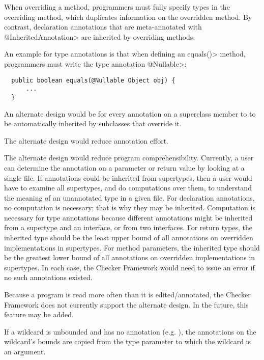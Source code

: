 
When overriding a method, programmers must fully specify types in the overriding
method, which duplicates information on the overridden method.
By contrast, declaration annotations that are meta-annotated with
\<@InheritedAnnotation> are inherited by overriding methods.

An example for type annotations is that when defining an \<equals()>
method, programmers must write the type annotation \<@Nullable>:

\begin{Verbatim}
  public boolean equals(@Nullable Object obj) {
      ...
  }
\end{Verbatim}

An alternate design would be for every annotation on a superclass member to
to be automatically inherited by subclasses that override it.

The alternate design would reduce annotation effort.

The alternate design would reduce program comprehensibility.
Currently, a user can determine the annotation on a parameter or return
value by looking at a single file.  If annotations could be inherited from
supertypes, then a user would have to examine all supertypes, and do
computations over them, to understand the meaning of an unannotated type in
a given file.
For declaration annotations, no computation is necessary; that is why they
may be inherited.
Computation is necessary for type annotations because different annotations might be inherited
from a supertype and an interface, or from two interfaces.  For return
types, the inherited type should be the least upper bound of all
annotations on overridden implementations in supertypes.  For method
parameters, the inherited type should be the greatest lower bound of all
annotations on overridden implementations in supertypes.  In each case, the
Checker Framework would need to issue an error if no such annotations existed.

Because a program is read more often than it is edited/annotated, the
Checker Framework does not currently support the alternate design.  In the
future, this feature may be added.



If a wildcard is unbounded and has no annotation (e.g. ),
the annotations on the wildcard's bounds are copied from the type parameter
to which the wildcard is an argument.

